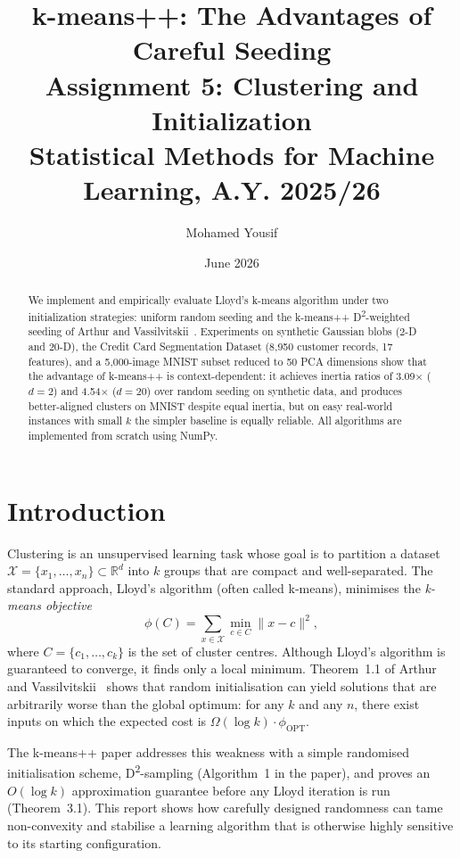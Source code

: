 \documentclass[11pt,a4paper]{article}
\title{%
  \textbf{k-means++: The Advantages of Careful Seeding}\\[4pt]
  \large Assignment 5: Clustering and Initialization\\
  Statistical Methods for Machine Learning, A.Y. 2025/26
}
\author{Mohamed Yousif}
\date{June 2026}
\newcommand{\OPT}{\phi_{\mathrm{OPT}}}
\newcommand{\phiC}{\phi(C)}
\begin{document}
\maketitle

\begin{abstract}
We implement and empirically evaluate Lloyd's k-means algorithm under two
initialization strategies: uniform random seeding and the k-means++ D\textsuperscript{2}-weighted
seeding of Arthur and Vassilvitskii~\cite{arthur2007kmeans}.
Experiments on synthetic Gaussian blobs (2-D and 20-D), the Credit Card Segmentation
Dataset (8{,}950 customer records, 17 features), and a 5{,}000-image MNIST
subset reduced to 50 PCA dimensions show that the advantage of k-means++ is
context-dependent: it achieves inertia ratios of 3.09$\times$ ($d=2$) and
4.54$\times$ ($d=20$) over random seeding on synthetic data, and produces
better-aligned clusters on MNIST despite equal inertia, but on easy real-world
instances with small $k$ the simpler baseline is equally reliable.
All algorithms are implemented from scratch using NumPy.
\end{abstract}

\section{Introduction}

Clustering is an unsupervised learning task whose goal is to partition a
dataset $\mathcal{X} = \{x_1, \dots, x_n\} \subset \mathbb{R}^d$ into
$k$ groups that are compact and well-separated.
The standard approach, Lloyd's algorithm (often called k-means), minimises
the \emph{k-means objective}
\[
  \phiC = \sum_{x \in \mathcal{X}} \min_{c \in C} \|x - c\|^2,
\]
where $C = \{c_1, \dots, c_k\}$ is the set of cluster centres.
Although Lloyd's algorithm is guaranteed to converge, it finds only a local
minimum.
Theorem~1.1 of Arthur and Vassilvitskii~\cite{arthur2007kmeans} shows that
random initialisation can yield solutions that are arbitrarily worse than
the global optimum: for any $k$ and any $n$, there exist inputs on which
the expected cost is $\Omega(\log k) \cdot \OPT$.

The k-means++ paper addresses this weakness with a simple randomised
initialisation scheme, D\textsuperscript{2}-sampling (Algorithm~1 in the
paper), and proves an $O(\log k)$ approximation guarantee before any
Lloyd iteration is run (Theorem~3.1).
This report shows how carefully designed randomness can tame non-convexity
and stabilise a learning algorithm that is otherwise highly sensitive to
its starting configuration.
\end{document}
